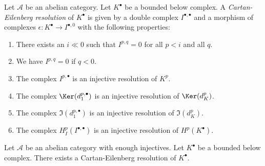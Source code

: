 \begin{definition}
\label{definition-cartan-eilenberg}
Let $\mathcal{A}$ be an abelian category.
Let $K^\bullet$ be a bounded below complex.
A {\it Cartan-Eilenberg resolution} of $K^\bullet$
is given by a double complex $I^{\bullet, \bullet}$
and a morphism of complexes $\epsilon : K^\bullet \to I^{\bullet, 0}$
with the following properties:
\begin{enumerate}
\item There exists an $i \ll 0$ such that $I^{p, q} = 0$ for all $p < i$
and all $q$.
\item We have $I^{p, q} = 0$ if $q < 0$.
\item The complex $I^{p, \bullet}$ is an injective resolution of $K^p$.
\item The complex $\Ker(d_1^{p, \bullet})$ is an injective resolution
of $\Ker(d_K^p)$.
\item The complex $\Im(d_1^{p, \bullet})$ is an injective resolution
of $\Im(d_K^p)$.
\item The complex $H^p_I(I^{\bullet, \bullet})$ is an injective resolution
of $H^p(K^\bullet)$.
\end{enumerate}
\end{definition}

\begin{lemma}
\label{lemma-cartan-eilenberg}
Let $\mathcal{A}$ be an abelian category with enough injectives.
Let $K^\bullet$ be a bounded below complex.
There exists a Cartan-Eilenberg resolution of $K^\bullet$.
\end{lemma}

